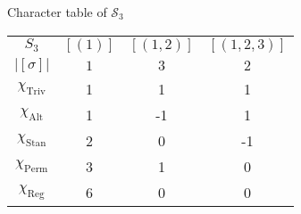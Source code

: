 \documentclass[10pt]{beamer}
\newcommand{\Sym}{\mathcal{S}}
\newcommand{\Reg}{\text{Reg}}
\newcommand{\Triv}{\text{Triv}}
\newcommand{\Alt}{\text{Alt}}
\newcommand{\Perm}{\text{Perm}}
\newcommand{\Stan}{\text{Stan}}
\begin{document}
	\begin{frame}{Character table of $\Sym_3$}
		\begin{example}[$\Sym_3$]
			\begin{table}[hbt!]
			\centering
			
			\begin{tabular}{c | c c c}
				$S_3$         & $[(1)]$   & $[(1,2)]$  & $[(1,2,3)]$ \\
				$|[\sigma]|$    & $ 1$ & $ 3$ & $ 2$ \\ \hline
				$\chi_\Triv$       & 1       & 1       & 1       \\
				$\chi_\Alt$       & 1       & -1      & 1       \\
				$\chi_\Stan$       & 2       & 0       & -1      \\ \hline\hline
				$\chi_\Perm$       & 3       & 1       & 0       \\
				$\chi_\Reg$       & 6       & 0       & 0       		\end{tabular}
			
		\end{table}
		\end{example}
	\end{frame}
	
\end{document}
